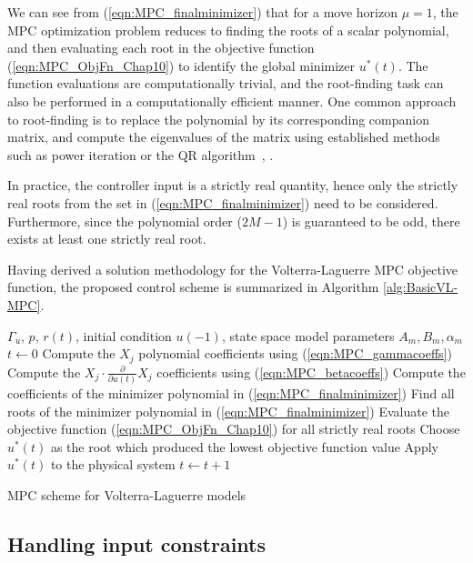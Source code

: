 We can see from (\ref{eqn:MPC_finalminimizer}) that for a move horizon $\mu=1$, the MPC optimization problem reduces to finding the roots of a scalar polynomial, and then evaluating each root in the objective function (\ref{eqn:MPC_ObjFn_Chap10}) to identify the global minimizer $u^*(t)$. The function evaluations are computationally trivial, and the root-finding task can also be performed in a computationally efficient manner. One common approach to root-finding is to replace the polynomial by its corresponding companion matrix, and compute the eigenvalues of the matrix using established methods such as power iteration or the QR algorithm~\cite{Francis1961}, \cite{Kublanovskaya1962}.
\begin{rem}
In practice, the controller input is a strictly real quantity, hence only the strictly real roots from the set in (\ref{eqn:MPC_finalminimizer}) need to be considered. Furthermore, since the polynomial order ($2M-1$) is guaranteed to be odd, there exists at least one strictly real root.
\end{rem}

Having derived a solution methodology for the Volterra-Laguerre MPC objective function, the proposed control scheme is summarized in Algorithm \ref{alg:BasicVL-MPC}.

\begin{algorithm}[h]
\begin{algorithmic}[1]
\Require $\Gamma_u$, $p$, $r(t)$, initial condition $u(-1)$, state space model parameters $A_m, B_m, \alpha_m$ %
\State $t \gets 0$
\State Compute the $X_j$ polynomial coefficients using (\ref{eqn:MPC_gammacoeffs}) 
\State Compute the $X_j \cdot \frac{\partial}{\partial u(t)} X_j$ coefficients using (\ref{eqn:MPC_betacoeffs}) 
\EndFor
\State Compute the coefficients of the minimizer polynomial in (\ref{eqn:MPC_finalminimizer})
\State Find all roots of the minimizer polynomial in (\ref{eqn:MPC_finalminimizer})
\State Evaluate the objective function (\ref{eqn:MPC_ObjFn_Chap10}) for all strictly real roots
\State Choose $u^*(t)$ as the root which produced the lowest objective function value
\State Apply $u^*(t)$ to the physical system
\State $t \gets t+1$
\EndWhile
\end{algorithmic}
\caption{MPC scheme for Volterra-Laguerre models }
\label{alg:BasicVL-MPC}
\end{algorithm}

\subsection{Handling input constraints}

